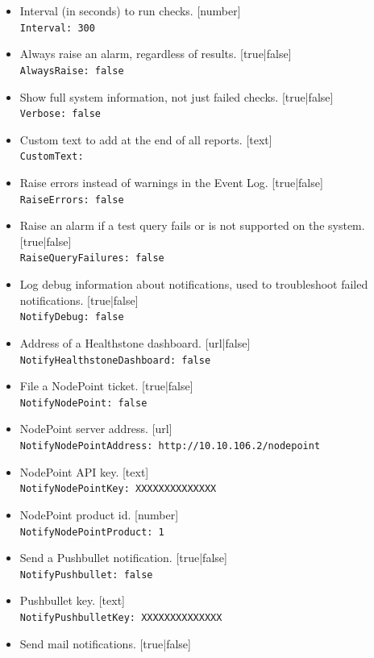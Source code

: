 \documentclass[11pt]{article}
\begin{document}
\begin{itemize}
\item Interval (in seconds) to run checks. [number]\\
\texttt{Interval: 300}
\item Always raise an alarm, regardless of results. [true|false]\\
\texttt{AlwaysRaise: false}
\item Show full system information, not just failed checks. [true|false]\\
\texttt{Verbose: false}
\item Custom text to add at the end of all reports. [text]\\
\texttt{CustomText:}
\item Raise errors instead of warnings in the Event Log. [true|false]\\
\texttt{RaiseErrors: false}
\item Raise an alarm if a test query fails or is not supported on the system. [true|false]\\
\texttt{RaiseQueryFailures: false}
\item Log debug information about notifications, used to troubleshoot failed notifications. [true|false]\\
\texttt{NotifyDebug: false}
\item Address of a Healthstone dashboard. [url|false]\\
\texttt{NotifyHealthstoneDashboard: false}
\item File a NodePoint ticket. [true|false]\\
\texttt{NotifyNodePoint: false}
\item NodePoint server address. [url]\\
\texttt{NotifyNodePointAddress: http://10.10.106.2/nodepoint}
\item NodePoint API key. [text]\\
\texttt{NotifyNodePointKey: XXXXXXXXXXXXXX}
\item NodePoint product id. [number]\\
\texttt{NotifyNodePointProduct: 1}
\item Send a Pushbullet notification. [true|false]\\
\texttt{NotifyPushbullet: false}
\item Pushbullet key. [text]\\
\texttt{NotifyPushbulletKey: XXXXXXXXXXXXXX}
\item Send mail notifications. [true|false]\\

\end{itemize}
\end{document}
